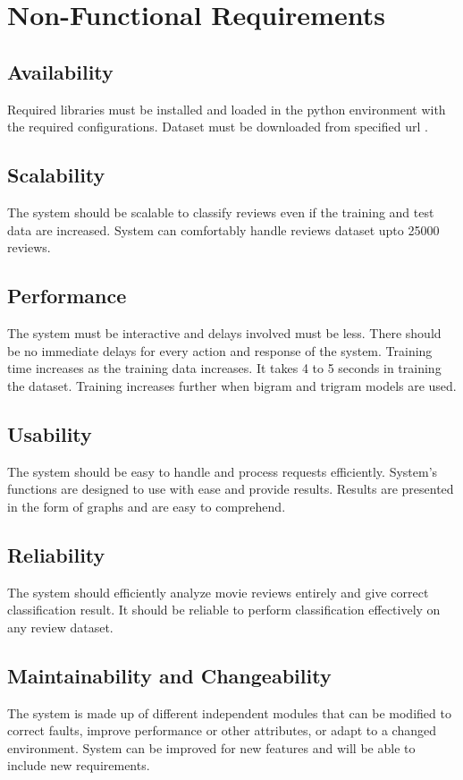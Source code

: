 \documentclass[oneside,a4paper,12pt]{pictreport}
\begin{document}
\section{Non-Functional Requirements}
\subsection{Availability}
Required libraries must be installed and loaded in the python environment with the required configurations. Dataset must be downloaded from specified url \cite{dataset}.

\subsection{Scalability}
The system should be scalable to classify reviews even if the training and test data are increased. System can comfortably handle 
reviews dataset upto 25000 reviews.

\subsection{Performance}
The system must be interactive and delays involved must be less. There should be no immediate delays for every action and response of the system. Training time increases as the training data increases. It takes 4 to 5 seconds in training the dataset. Training increases further when bigram and trigram models are used.


\subsection{Usability}
The system should be easy to handle and process requests efficiently. System's functions are designed to use with ease and provide results. Results are presented in the form of graphs and are easy to comprehend.

\subsection{Reliability}
The system should efficiently analyze movie reviews entirely and give correct classification result. It should be reliable to perform 
classification effectively on any review dataset.
\subsection{Maintainability and Changeability}
The system is made up of different independent modules that can be modified to correct faults, improve performance or other attributes, or adapt to a changed environment. System can be improved for new features and will be able to include new requirements.
\end{document}
